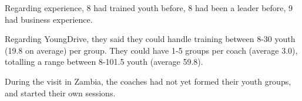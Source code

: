 Regarding experience, 8 had trained youth before, 8 had been a leader before, 9 had business experience.

Regarding YoungDrive, they said they could handle training between 8-30 youth (19.8 on average) per group. They could have 1-5 groups per coach (average 3.0), totalling a range between 8-101.5 youth (average 59.8).

During the visit in Zambia, the coaches had not yet formed their youth groups, and started their own sessions.
